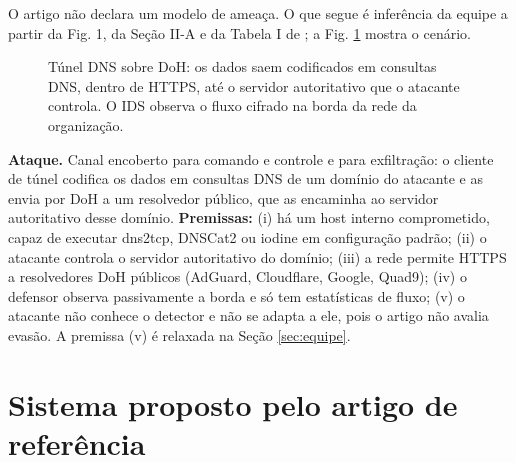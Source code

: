 \documentclass[conference]{IEEEtran}
\begin{document}
O artigo não declara um modelo de ameaça. O que segue é inferência da equipe a partir da Fig. 1, da Seção II-A e da Tabela I de \cite{zebin2022}; a Fig. \ref{fig:ameaca} mostra o cenário.

\begin{figure}[!t]
\centering
{}
\caption{Túnel DNS sobre DoH: os dados saem codificados em consultas DNS, dentro de HTTPS, até o servidor autoritativo que o atacante controla. O IDS observa o fluxo cifrado na borda da rede da organização.}
\label{fig:ameaca}
\end{figure}

\textbf{Ataque.} Canal encoberto para comando e controle e para exfiltração: o cliente de túnel codifica os dados em consultas DNS de um domínio do atacante e as envia por DoH a um resolvedor público, que as encaminha ao servidor autoritativo desse domínio. \textbf{Premissas:} (i) há um host interno comprometido, capaz de executar dns2tcp, DNSCat2 ou iodine em configuração padrão; (ii) o atacante controla o servidor autoritativo do domínio; (iii) a rede permite HTTPS a resolvedores DoH públicos (AdGuard, Cloudflare, Google, Quad9); (iv) o defensor observa passivamente a borda e só tem estatísticas de fluxo; (v) o atacante não conhece o detector e não se adapta a ele, pois o artigo não avalia evasão. A premissa (v) é relaxada na Seção \ref{sec:equipe}.

\section{Sistema proposto pelo artigo de referência}
\label{sec:sistema}
\end{document}
